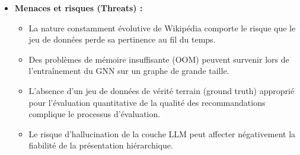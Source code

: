 \begin{itemize}
    \item \textbf{Menaces et risques (Threats) :}
    \begin{itemize}
        \item La nature constamment évolutive de Wikipédia comporte le risque que le jeu de données perde sa pertinence au fil du temps.
        \item Des problèmes de mémoire insuffisante (OOM) peuvent survenir lors de l'entraînement du GNN sur un graphe de grande taille.
        \item L'absence d'un jeu de données de vérité terrain (ground truth) approprié pour l'évaluation quantitative de la qualité des recommandations complique le processus d'évaluation.
        \item Le risque d'hallucination de la couche LLM peut affecter négativement la fiabilité de la présentation hiérarchique.
    \end{itemize}
\end{itemize}